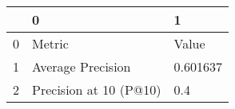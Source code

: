 \begin{tabular}{lll}
\toprule
{} &                       0 &         1 \\
\midrule
0 &                  Metric &     Value \\
1 &       Average Precision &  0.601637 \\
2 &  Precision at 10 (P@10) &       0.4 \\
\bottomrule
\end{tabular}

